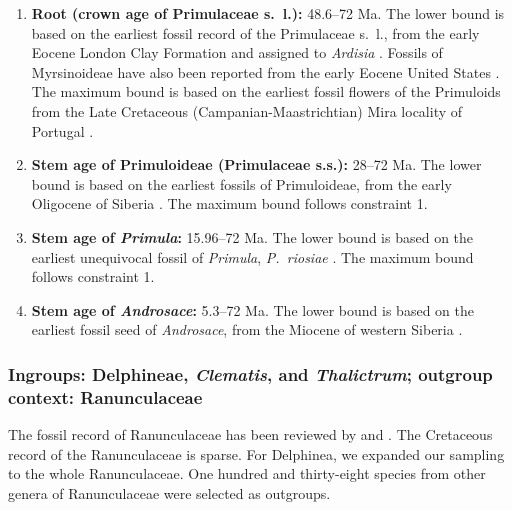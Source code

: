 \documentclass[10pt]{article}
\newcommand{\fntodo}[2][]
{\todo[caption={#2}, size=\footnotesize, #1]
{\begin{spacing}{0.5}#2\end{spacing}}}
\begin{document}
\begin{enumerate}
\item \textbf{Root (crown age of Primulaceae s.~l.):} 48.6--72 Ma. The
  lower bound is based on the earliest fossil record of the
  Primulaceae s.~l., from the early Eocene London Clay Formation and
  assigned to \textit{Ardisia} \citep{Collinson1984}. Fossils of
  Myrsinoideae have also been reported from the early Eocene United
  States \citep{Irving1971}. The maximum bound is based on the
  earliest fossil flowers of {\color{red}the Primuloids} \fntodo{what
    is this group?} from the Late Cretaceous (Campanian-Maastrichtian)
  Mira locality of Portugal \citep{Friis2011}.

\item \textbf{Stem age of Primuloideae (Primulaceae s.s.):} 28--72
  Ma. The lower bound is based on the earliest fossils of
  Primuloideae, from the early Oligocene of Siberia
  \citep{Nikitin2006}. {\color{red}The maximum bound follows
    constraint 1.}

\item \textbf{Stem age of \textit{Primula}:} 15.96--72 Ma. The lower
  bound is based on the earliest unequivocal fossil of
  \textit{Primula}, \textit{P.~riosiae}
  \citep{deVos2014}. {\color{red}The maximum bound follows constraint
    1.}

\item \textbf{Stem age of \textit{Androsace}:} 5.3--72 Ma. The lower
  bound is based on the earliest fossil seed of \textit{Androsace},
  from the Miocene of western Siberia \citep{Dorofeev1963}.
\end{enumerate}

\subsubsection*{Ingroups: Delphineae, \textit{Clematis}, and
  \textit{Thalictrum}; outgroup context: Ranunculaceae}

The fossil record of Ranunculaceae has been reviewed by
\citet{Friis2011} and \citet{Pigg2005}. The Cretaceous record of the
Ranunculaceae is sparse. For Delphinea, we expanded our sampling to
the whole Ranunculaceae. One hundred and thirty-eight species from
other genera of Ranunculaceae were selected as outgroups.
\end{document}
